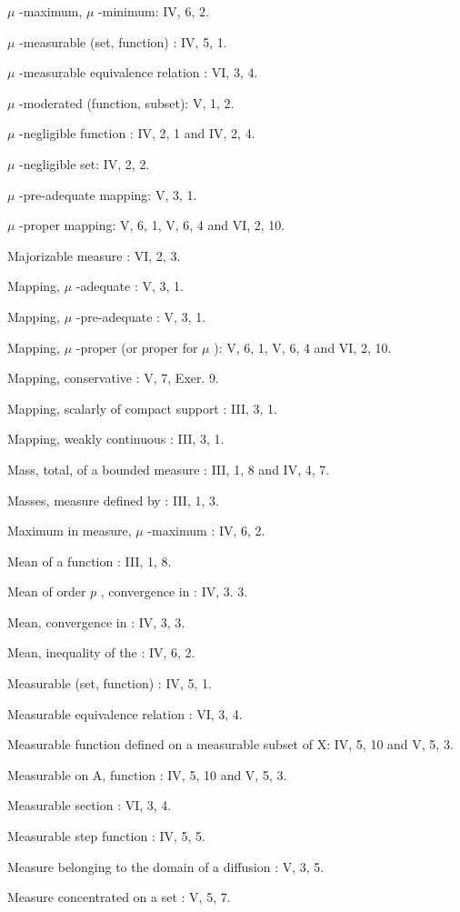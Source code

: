 \(\mu\) -maximum, \(\mu\) -minimum: IV, 6, 2.

\(\mu\) -measurable (set, function) : IV, 5, 1.

\(\mu\) -measurable equivalence relation : VI, 3, 4.

\(\mu\) -moderated (function, subset): V, 1, 2.

\(\mu\) -negligible function : IV, 2, 1 and IV, 2, 4.

\(\mu\) -negligible set: IV, 2, 2.

\(\mu\) -pre-adequate mapping: V, 3, 1.

\(\mu\) -proper mapping: V, 6, 1, V, 6, 4 and VI, 2, 10.

Majorizable measure : VI, 2, 3.

Mapping, \(\mu\) -adequate : V, 3, 1.

Mapping, \(\mu\) -pre-adequate : V, 3, 1.

Mapping, \(\mu\) -proper (or proper for \(\mu\) ): V, 6, 1, V, 6, 4 and VI, 2, 10.

Mapping, conservative : V, 7, Exer. 9.

Mapping, scalarly of compact support : III, 3, 1.

Mapping, weakly continuous : III, 3, 1.

Mass, total, of a bounded measure : III, 1, 8 and IV, 4, 7.

Masses, measure defined by : III, 1, 3.

Maximum in measure, \(\mu\) -maximum : IV, 6, 2.

Mean of a function : III, 1, 8.

Mean of order \(p\) , convergence in : IV, 3. 3.

Mean, convergence in : IV, 3, 3.

Mean, inequality of the : IV, 6, 2.

Measurable (set, function) : IV, 5, 1.

Measurable equivalence relation : VI, 3, 4.

Measurable function defined on a measurable subset of X: IV, 5, 10 and V, 5, 3.

Measurable on A, function : IV, 5, 10 and V, 5, 3.

Measurable section : VI, 3, 4.

Measurable step function : IV, 5, 5.

Measure belonging to the domain of a diffusion : V, 3, 5.

Measure concentrated on a set : V, 5, 7.

